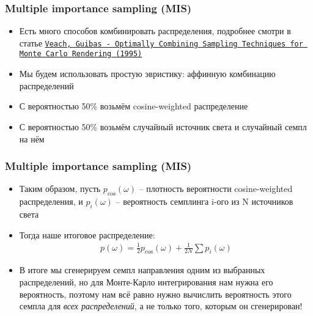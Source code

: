 \documentclass[10pt]{beamer}
\begin{document}
\begin{frame}
\frametitle{Multiple importance sampling (MIS)}
\begin{itemize}
\item Есть много способов комбинировать распределения, подробнее смотри в статье \href{https://cseweb.ucsd.edu/~viscomp/classes/cse168/sp21/readings/veach.pdf}{\texttt{Veach, Guibas - Optimally Combining Sampling Techniques for Monte Carlo Rendering (1995)}}
\pause
\item Мы будем использовать простую эвристику: аффинную комбинацию распределений
\pause
\item С вероятностью 50\% возьмём cosine-weighted распределение
\pause
\item С вероятностью 50\% возьмём случайный источник света и случайный семпл на нём
\end{itemize}
\end{frame}

\begin{frame}
\frametitle{Multiple importance sampling (MIS)}
\begin{itemize}
\item Таким образом, пусть \begin{math}p_{\cos}(\omega)\end{math} -- плотность вероятности cosine-weighted распределения, и \begin{math}p_i(\omega)\end{math} -- вероятность семплинга i-ого из N источников света
\pause
\item Тогда наше итоговое распределение:
\begin{gather*}
p(\omega) = \frac{1}{2}p_{\cos}(\omega) + \frac{1}{2N}\sum p_i(\omega)
\end{gather*}
\pause
\item В итоге мы сгенерируем семпл направления одним из выбранных распределений, но для Монте-Карло интегрирования нам нужна его вероятность, поэтому нам всё равно нужно вычислить вероятность этого семпла для \textit{всех распределений}, а не только того, которым он сгенерирован!
\end{itemize}
\end{frame}
\end{document}
